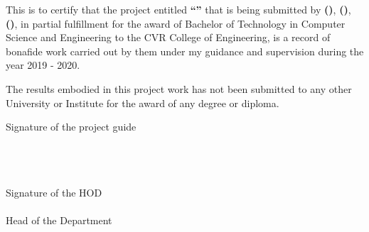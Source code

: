 \begin{spacing}{1.67}
\setlength{\leftskip}{1.2cm}
This is to certify that the project entitled 
\textbf{\MakeUppercase{“\projectTitle”}}
that is being submitted by 
\textbf{\MakeUppercase{\studentAName{} (\MakeUppercase{\rollNoA{}})}},
\textbf{\MakeUppercase{\studentBName{} (\MakeUppercase{\rollNoB{}})}},
\textbf{\MakeUppercase{\studentCName{} (\MakeUppercase{\rollNoC{}})}},
in partial fulfillment for the award of Bachelor of Technology in Computer Science and  
Engineering to the CVR College of Engineering, is a record of bonafide work carried out 
by them under my guidance and supervision during the year 2019 - 2020.

\setlength{\leftskip}{1.2cm}
The results embodied in this project work has not been submitted to any other University 
or Institute for the award of any degree or diploma.

\vspace{\baselineskip}

\setlength{\leftskip}{0pt}
\begin{minipage}[t]{.5\textwidth}
    \raggedright
    Signature of the project guide \\
    \textbf{\MakeUppercase{\guideName{}}} \\
    \guideDesignation \\
    \department{} \\
    \collegeName{}
\end{minipage}%
\begin{minipage}[t]{.5\textwidth}
    \raggedleft
    Signature of the HOD \\
    \textbf{\MakeUppercase{\hodName}} \\
    Head of the Department \\
    \department{} \\
    \collegeName{}
\end{minipage}

\end{spacing}